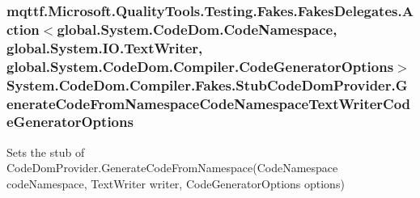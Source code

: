 \hypertarget{class_system_1_1_code_dom_1_1_compiler_1_1_fakes_1_1_stub_code_dom_provider_a280a9bda55999b282e355c78b8b4ebad}{
\subsubsection[{Generate\-Code\-From\-Namespace\-Code\-Namespace\-Text\-Writer\-Code\-Generator\-Options}]{\setlength{\rightskip}{0pt plus 5cm}mqttf.\-Microsoft.\-Quality\-Tools.\-Testing.\-Fakes.\-Fakes\-Delegates.\-Action$<$global.\-System.\-Code\-Dom.\-Code\-Namespace, global.\-System.\-I\-O.\-Text\-Writer, global.\-System.\-Code\-Dom.\-Compiler.\-Code\-Generator\-Options$>$ System.\-Code\-Dom.\-Compiler.\-Fakes.\-Stub\-Code\-Dom\-Provider.\-Generate\-Code\-From\-Namespace\-Code\-Namespace\-Text\-Writer\-Code\-Generator\-Options}}\label{class_system_1_1_code_dom_1_1_compiler_1_1_fakes_1_1_stub_code_dom_provider_a280a9bda55999b282e355c78b8b4ebad}


Sets the stub of Code\-Dom\-Provider.\-Generate\-Code\-From\-Namespace(\-Code\-Namespace code\-Namespace, Text\-Writer writer, Code\-Generator\-Options options)

